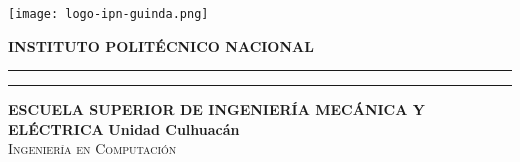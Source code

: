 
\thispagestyle{empty}
\begin{minipage}[c][0.17\textheight][c]{0.22\textwidth}
	\begin{center}
		\texttt{[image: logo-ipn-guinda.png]}
	\end{center}
\end{minipage}
\begin{minipage}[c][0.195\textheight][c]{0.71\textwidth}
	\begin{center}
		\vspace{0.3cm}
		\textbf{\Large INSTITUTO POLIT\'ECNICO NACIONAL}
		\vspace{0.4cm}
		\color{Black}\hrule height1pt
		\vspace{0.2cm}
		{\color{Black}\hrule height1pt}
		\vspace{0.4cm}
		\color{Black}\textbf{ESCUELA SUPERIOR DE INGENIER\'IA MEC\'ANICA Y EL\'ECTRICA}
		\textbf{Unidad Culhuac\'an\\}
		\textsc{Ingenier\'ia en Computaci\'on}\\[0.5cm] %
	\end{center}
\end{minipage}


